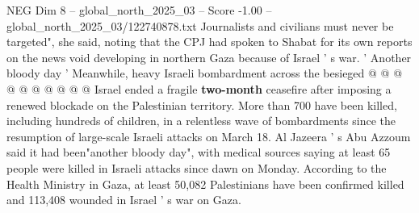 \begin{textsample}{NEG Dim 8 – global\_north\_2025\_03 – Score -1.00 – global\_north\_2025\_03/122740878.txt}
Journalists and civilians must never be targeted", she said, noting that the CPJ had spoken to Shabat for its own reports on the news void developing in northern Gaza because of Israel ' s war. ' Another bloody day ' Meanwhile, heavy Israeli bombardment across the besieged @ @ @ @ @ @ @ @ @ @ Israel ended a fragile \textbf{two-month} ceasefire after imposing a renewed blockade on the Palestinian territory.
More than 700 have been killed, including hundreds of children, in a relentless wave of bombardments since the resumption of large-scale Israeli attacks on March 18.
Al Jazeera ' s Abu Azzoum said it had been"another bloody day", with medical sources saying at least 65 people were killed in Israeli attacks since dawn on Monday.
According to the Health Ministry in Gaza, at least 50,082 Palestinians have been confirmed killed and 113,408 wounded in Israel ' s war on Gaza.

\end{textsample}

